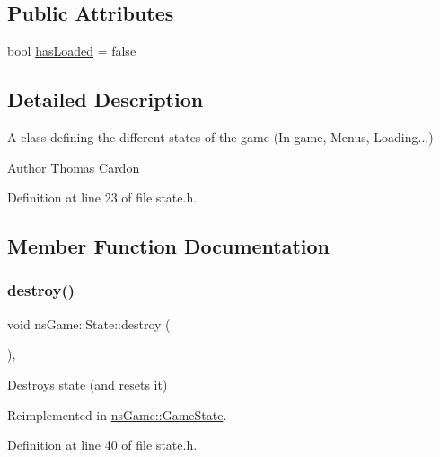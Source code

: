 \subsection*{Public Attributes}
\begin{DoxyCompactItemize}
\item 
bool \hyperlink{structns_game_1_1_state_a5e7566cb6bba78e6a01d4fc5f568ec5d}{has\+Loaded} = false
\end{DoxyCompactItemize}


\subsection{Detailed Description}
A class defining the different states of the game (In-\/game, Menus, Loading...) 

\begin{DoxyAuthor}{Author}
Thomas Cardon 
\end{DoxyAuthor}


Definition at line 23 of file state.\+h.



\subsection{Member Function Documentation}
\mbox{\label{structns_game_1_1_state_a70a0cf146071a8f9fcb8ca0b2c0f8f44}} 
\subsubsection{\texorpdfstring{destroy()}{destroy()}}
{\footnotesize\ttfamily void ns\+Game\+::\+State\+::destroy (\begin{DoxyParamCaption}{ }\end{DoxyParamCaption})\hspace{0.3cm}{\ttfamily [inline]}, {\ttfamily [virtual]}}



Destroys state (and resets it) 



Reimplemented in \hyperlink{classns_game_1_1_game_state_ac0fdc8e463ca2e79a0fb58e12e5b39c9}{ns\+Game\+::\+Game\+State}.



Definition at line 40 of file state.\+h.

